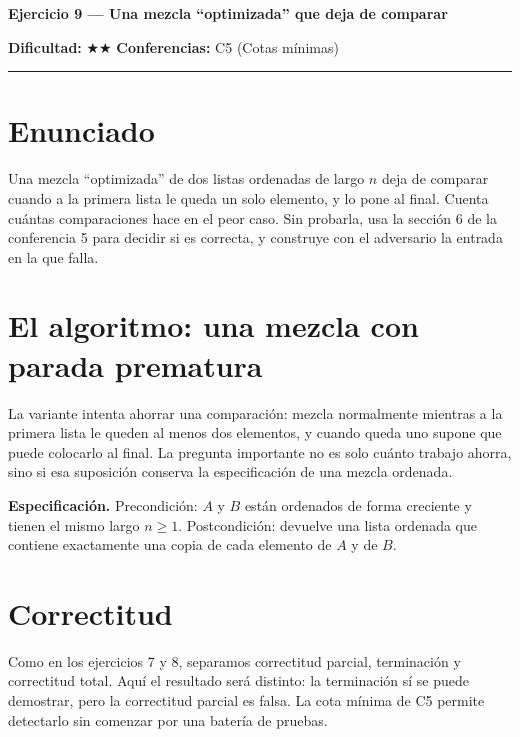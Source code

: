 \documentclass[11pt]{article}
\begin{document}
{\LARGE\bfseries\color{azultitulo} Ejercicio 9 --- Una mezcla ``optimizada'' que deja de comparar}

\vspace{2pt}
\textbf{Dificultad:} $\bigstar\bigstar$ \quad \textbf{Conferencias:} C5 (Cotas mínimas)
\vspace{8pt}
\hrule
\vspace{12pt}

\section*{Enunciado}
\begin{enunciado}
Una mezcla ``optimizada'' de dos listas ordenadas de largo $n$ deja de comparar cuando a la primera lista
le queda un solo elemento, y lo pone al final. Cuenta cuántas comparaciones hace en el peor caso. Sin
probarla, usa la sección 6 de la conferencia 5 para decidir si es correcta, y construye con el adversario
la entrada en la que falla.
\end{enunciado}

\section{El algoritmo: una mezcla con parada prematura}

La variante intenta ahorrar una comparación: mezcla normalmente mientras a la primera lista le queden al
menos dos elementos, y cuando queda uno supone que puede colocarlo al final. La pregunta importante no es
solo cuánto trabajo ahorra, sino si esa suposición conserva la especificación de una mezcla ordenada.

\textbf{Especificación.} Precondición: $A$ y $B$ están ordenados de forma creciente y tienen el mismo largo
$n\ge1$. Postcondición: devuelve una lista ordenada que contiene exactamente una copia de cada elemento de
$A$ y de $B$.



\section{Correctitud}

Como en los ejercicios 7 y 8, separamos correctitud parcial, terminación y correctitud total. Aquí el
resultado será distinto: la terminación sí se puede demostrar, pero la correctitud parcial es falsa. La
cota mínima de C5 permite detectarlo sin comenzar por una batería de pruebas.
\end{document}
